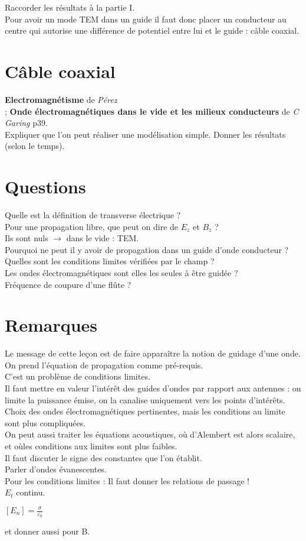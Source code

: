 \documentclass[12pt,prb,aps,epsf]{article}
\begin{document}
Raccorder les résultats à la partie I.\\

Pour avoir un mode TEM dans un guide il faut donc placer un conducteur au centre qui autorise une différence de potentiel entre lui et le guide : câble coaxial.

\section{Câble coaxial}
\textbf{Electromagnétisme} de \textit{Pérez}\\;
\textbf{Onde électromagnétiques dans le vide et les milieux conducteurs} de \textit{C Garing} p39.\\

Expliquer que l'on peut réaliser une modélisation simple. Donner les résultats (selon le temps).


\section*{Questions}
Quelle est la définition de transverse électrique ?\\

Pour une propagation libre, que peut on dire de $E_z$ et $B_z$ ?\\
Ils sont nuls $\rightarrow$ dans le vide : TEM.\\

Pourquoi ne peut il y avoir de propagation dans un guide d'onde conducteur ?\\

Quelles sont les conditions limites vérifiées par le champ ?\\

Les ondes électromagnétiques sont elles les seules à être guidée ?\\

Fréquence de coupure d'une flûte ?\\

\section*{Remarques}
Le message de cette leçon est de faire apparaître la notion de guidage d'une onde.\\
On prend l'équation de propagation comme pré-requis.\\
C'est un problème de conditions limites.\\
Il faut mettre en valeur l'intérêt des guides d'ondes par rapport aux antennes : on limite la puissance émise, on la canalise uniquement vers les points d'intérêts. \\
Choix des ondes électromagnétiques pertinentes, mais les conditions au limite sont plus compliquées.\\
On peut aussi traiter les équations acoustiques, où d'Alembert est alors scalaire, et oùles conditions aux limites sont plus faibles.\\
Il faut discuter le signe des constantes que l'on établit.\\
Parler d'ondes évanescentes.\\
Pour les conditions limites : Il faut donner les relations de passage !\\

$E_t$ continu.

$[E_n] = \frac{\sigma}{\varepsilon_0}$

et donner aussi pour B.

	
\end{document}
